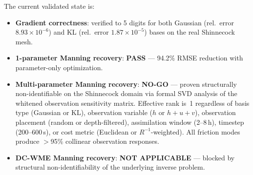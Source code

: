 \documentclass[11pt]{article}
\begin{document}
The current validated state is:
\begin{itemize}
\item \textbf{Gradient correctness}: verified to 5 digits for both Gaussian (rel.\ error $8.93\times 10^{-6}$) and KL (rel.\ error $1.87\times 10^{-5}$) bases on the real Shinnecock mesh.
\item \textbf{1-parameter Manning recovery}: \textbf{PASS} --- 94.2\% RMSE reduction with parameter-only optimization.
\item \textbf{Multi-parameter Manning recovery}: \textbf{NO-GO} --- proven structurally non-identifiable on the Shinnecock domain via formal SVD analysis of the whitened observation sensitivity matrix. Effective rank is~1 regardless of basis type (Gaussian or KL), observation variable ($h$ or $h{+}u{+}v$), observation placement (random or depth-filtered), assimilation window (2--8\,h), timestep (200--600\,s), or cost metric (Euclidean or $R^{-1}$-weighted). All friction modes produce $>$95\% collinear observation responses.
\item \textbf{DC-WME Manning recovery}: \textbf{NOT APPLICABLE} --- blocked by structural non-identifiability of the underlying inverse problem.
\end{itemize}
\end{document}
